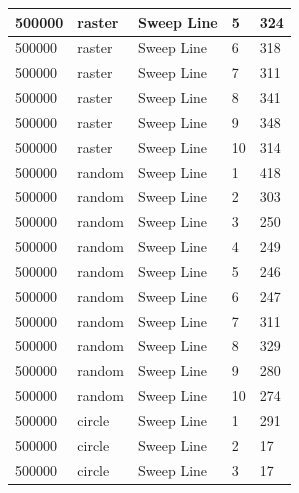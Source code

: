 \documentclass[12pt]{article}
\begin{document}
\begin{longtable}{|l|l|l|l|l|}
500000       & raster            & Sweep Line & 5          & 324                           \\ \hline
500000       & raster            & Sweep Line & 6          & 318                           \\ \hline
500000       & raster            & Sweep Line & 7          & 311                           \\ \hline
500000       & raster            & Sweep Line & 8          & 341                           \\ \hline
500000       & raster            & Sweep Line & 9          & 348                           \\ \hline
500000       & raster            & Sweep Line & 10         & 314                           \\ \hline
500000       & random            & Sweep Line & 1          & 418                           \\ \hline
500000       & random            & Sweep Line & 2          & 303                           \\ \hline
500000       & random            & Sweep Line & 3          & 250                           \\ \hline
500000       & random            & Sweep Line & 4          & 249                           \\ \hline
500000       & random            & Sweep Line & 5          & 246                           \\ \hline
500000       & random            & Sweep Line & 6          & 247                           \\ \hline
500000       & random            & Sweep Line & 7          & 311                           \\ \hline
500000       & random            & Sweep Line & 8          & 329                           \\ \hline
500000       & random            & Sweep Line & 9          & 280                           \\ \hline
500000       & random            & Sweep Line & 10         & 274                           \\ \hline
500000       & circle            & Sweep Line & 1          & 291                           \\ \hline
500000       & circle            & Sweep Line & 2          & 17                            \\ \hline
500000       & circle            & Sweep Line & 3          & 17                            \\ \hline

\end{longtable}
\end{document}
